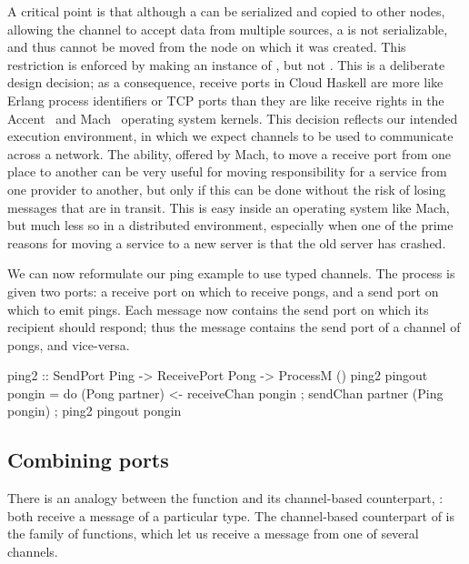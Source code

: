 \documentclass[preprint]{sigplanconf}
\begin{document}
A critical point is that although a  can be serialized and copied to other nodes, allowing the channel to accept data from multiple sources, a  is not serializable, and thus cannot be moved from the node on which it was created.
This restriction is enforced by making  an instance of , but not . 
This is a deliberate design decision; as a consequence, receive ports in Cloud Haskell are more like Erlang process identifiers or TCP ports than they are like receive rights in the Accent~\cite{Rashid81} and Mach~\cite[\S4.2.3]{free-s2008} operating system kernels.   
This decision reflects our intended execution environment, in which we expect channels to be used to communicate across a network.  
The ability, offered by Mach, to move a receive port from one place to another can be very useful for moving responsibility for a service from one provider to another, but only if this can be done without the risk of losing messages that are in transit.  
This is easy inside an operating system like Mach, but much less so in a distributed environment, especially when one of the prime reasons for moving a service to a new server is that the old server has crashed.  

We can now reformulate our ping example to use typed channels. The  process is given two ports: a receive port on which to receive pongs, and a send port on which to emit pings. Each message now contains the send port on which its recipient should respond; thus the  message contains the send port of a channel of pongs, and vice-versa.
\begin{code}
ping2 :: SendPort Ping -> ReceivePort Pong -> ProcessM ()
ping2 pingout pongin = 
   do { (Pong partner) <- receiveChan pongin
      ; sendChan partner (Ping pongin) 
      ; ping2 pingout pongin }
\end{code}



\subsection{Combining ports}
There is an analogy between the  function and its channel-based counterpart, : both receive a message of a particular type. 
The channel-based counterpart of  is the  family of functions, which let us receive a message from one of several channels.
\end{document}
